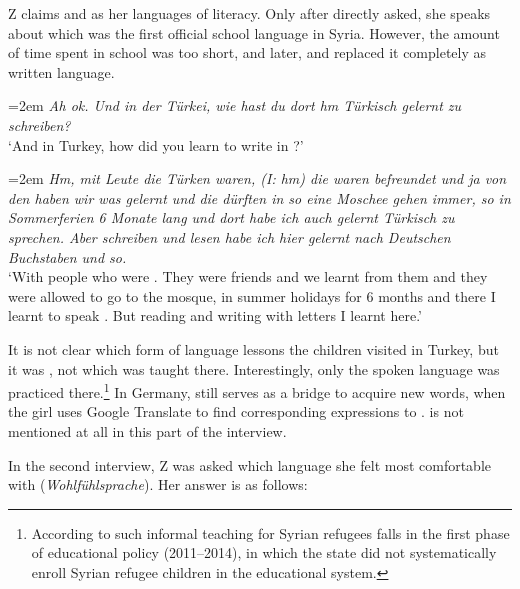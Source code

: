 \documentclass[output=paper,colorlinks,citecolor=brown]{langscibook}
\newenvironment{interview}{
  \setlength{\leftskip}{2.5em} %
  \setlength{\rightskip}{2.5em} %
  \setlength{\parindent}{0pt} %
  \vspace{\topsep} %
}{
  \vspace{\topsep} %
}
\newcommand{\speaker}[1]{%
  \noindent\hangindent=2em\makebox[1.5em][l]{#1:}\hspace{0.5em}%
}
\newcommand{\myattrib}[1]{%
    \attrib{#1}
}
\begin{document}
Z claims  and  as her languages of literacy. Only after directly asked, she speaks about  which was the first official school language in Syria. However, the amount of time spent in school was too short, and later,  and  replaced it completely as written language. 

\begin{interview}\label{ch2.5.ex.3}
\speaker{I}\textit{Ah ok. Und in der Türkei, wie hast du dort hm Türkisch gelernt zu schreiben?} \\
`And in Turkey, how did you learn to write in ?' 

\speaker{Z}\textit{Hm, mit Leute die Türken waren, \textnormal{(I: \textit{hm})} die waren befreundet und ja von den haben wir was gelernt und die dürften in so eine Moschee gehen immer, so in Sommerferien 6 Monate lang und dort habe ich auch gelernt Türkisch zu sprechen. Aber schreiben und lesen habe ich hier gelernt nach Deutschen Buchstaben und so.} \\
`With people who were . They were friends and we learnt from them and they were allowed to go to the mosque, in summer holidays for 6 months and there I learnt to speak . But reading and writing  with  letters I learnt here.' 
\myattrib{Int 1\_Z II, 32--38}
\end{interview}

It is not clear which form of language lessons the children visited in Turkey, but it was , not  which was taught there. Interestingly, only the spoken language was practiced there.\footnote{According to \citet[56]{chiari2018} such informal teaching for Syrian refugees falls in the first phase of educational policy (2011--2014), in which the  state did not systematically enroll Syrian refugee children in the educational system.} In Germany,  still serves as a bridge to acquire new  words, when the girl uses Google Translate to find corresponding expressions to .  is not mentioned at all in this part of the interview.

In the second interview, Z was asked which language she felt most comfortable with (\textit{Wohlfühlsprache}). Her answer is as follows:
\end{document}

